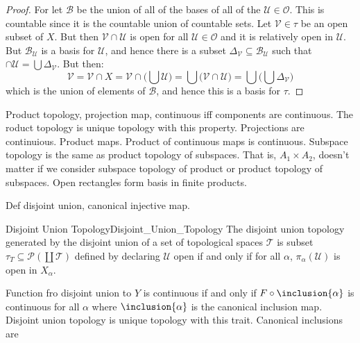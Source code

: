     \begin{proof}
        For let $\mathcal{B}$ be the union of all of the bases of all of the
        $\mathcal{U}\in\mathcal{O}$. This is countable since it is the
        countable union of countable sets. Let $\mathcal{V}\in\tau$ be an
        open subset of $X$. But then $\mathcal{V}\cap\mathcal{U}$ is open
        for all $\mathcal{U}\in\mathcal{O}$ and it is relatively open in
        $\mathcal{U}$. But $\mathcal{B}_{\mathcal{U}}$ is a basis for
        $\mathcal{U}$, and hence there is a subset
        $\Delta_{\mathcal{V}}\subseteq\mathcal{B}_{\mathcal{U}}$ such that
        $\cap\mathcal{U}=\bigcup\Delta_{\mathcal{V}}$. But then:
        \begin{equation}
            \mathcal{V}=\mathcal{V}\cap{X}=
            \mathcal{V}\cap\Big(\bigcup\mathcal{U}\Big)
            =\bigcup\big(\mathcal{V}\cap\mathcal{U}\big)
            =\bigcup\Big(\bigcup\Delta_{\mathcal{V}}\Big)
        \end{equation}
        which is the union of elements of $\mathcal{B}$, and hence this is a
        basis for $\tau$.
    \end{proof}
    Product topology, projection map, continuous iff components are
    continuous. The roduct topology is unique topology with this property.
    Projections are continuious. Product maps. Product of continuous maps
    is continuous. Subspace topology is the same as product topology of
    subspaces. That is, $A_{1}\times{A}_{2}$, doesn't matter if we consider
    subspace topology of product or product topology of subspaces.
    Open rectangles form basis in finite products.
    \par\hfill\par
    Def disjoint union, canonical injective map.
    \begin{fdefinition}{Disjoint Union Topology}{Disjoint_Union_Topology}
        The disjoint union topology generated by the disjoint union of a
        set of topological spaces $\mathscr{T}$ is subset
        $\tau_{T}\subseteq\mathcal{P}(\coprod\mathscr{T})$ defined by
        declaring $\mathcal{U}$ open if and only if for all $\alpha$,
        $\pi_{\alpha}(\mathcal{U})$ is open in $X_{\alpha}$.
    \end{fdefinition}
    Function fro disjoint union to $Y$ is continuous if and only if
    $F\circ\inclusion{\alpha}$ is continuous for all $\alpha$ where
    $\inclusion{\alpha}$ is the canonical inclusion map. Disjoint union
    topology is unique topology with this trait. Canonical inclusions are
